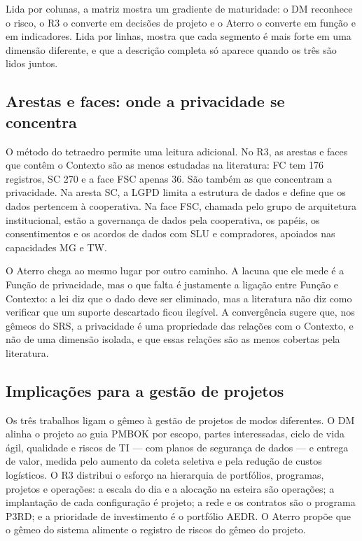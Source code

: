 \documentclass[12pt,a4paper,article,oneside,english,brazil]{abntex2}
\begin{document}
Lida por colunas, a matriz mostra um gradiente de maturidade: o DM reconhece o risco, o R3 o converte em decisões de projeto e o Aterro o converte em função e em indicadores. Lida por linhas, mostra que cada segmento é mais forte em uma dimensão diferente, e que a descrição completa só aparece quando os três são lidos juntos.

\subsection{Arestas e faces: onde a privacidade se concentra}

O método do tetraedro permite uma leitura adicional. No R3, as arestas e faces que contêm o Contexto são as menos estudadas na literatura: FC tem 176 registros, SC 270 e a face FSC apenas 36. São também as que concentram a privacidade. Na aresta SC, a LGPD limita a estrutura de dados e define que os dados pertencem à cooperativa. Na face FSC, chamada pelo grupo de arquitetura institucional, estão a governança de dados pela cooperativa, os papéis, os consentimentos e os acordos de dados com SLU e compradores, apoiados nas capacidades MG e TW.

O Aterro chega ao mesmo lugar por outro caminho. A lacuna que ele mede é a Função de privacidade, mas o que falta é justamente a ligação entre Função e Contexto: a lei diz que o dado deve ser eliminado, mas a literatura não diz como verificar que um suporte descartado ficou ilegível. A convergência sugere que, nos gêmeos do SRS, a privacidade é uma propriedade das relações com o Contexto, e não de uma dimensão isolada, e que essas relações são as menos cobertas pela literatura.

\subsection{Implicações para a gestão de projetos}

Os três trabalhos ligam o gêmeo à gestão de projetos de modos diferentes. O DM alinha o projeto ao guia PMBOK por escopo, partes interessadas, ciclo de vida ágil, qualidade e riscos de TI --- com planos de segurança de dados --- e entrega de valor, medida pelo aumento da coleta seletiva e pela redução de custos logísticos. O R3 distribui o esforço na hierarquia de portfólios, programas, projetos e operações: a escala do dia e a alocação na esteira são operações; a implantação de cada configuração é projeto; a rede e os contratos são o programa P3RD; e a prioridade de investimento é o portfólio AEDR. O Aterro propõe que o gêmeo do sistema alimente o registro de riscos do gêmeo do projeto.
\end{document}
